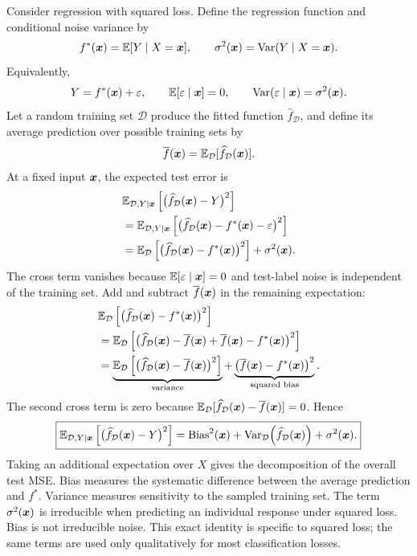 Consider regression with squared loss. Define the regression function and conditional noise variance by
\[
  f^*(\bm{x})=\mathbb{E}[Y\mid X=\bm{x}],
  \qquad
  \sigma^2(\bm{x})=\operatorname{Var}(Y\mid X=\bm{x}).
\]
Equivalently,
\[
  Y=f^*(\bm{x})+\varepsilon,
  \qquad
  \mathbb{E}[\varepsilon\mid\bm{x}]=0,
  \qquad
  \operatorname{Var}(\varepsilon\mid\bm{x})=\sigma^2(\bm{x}).
\]
Let a random training set $\mathcal D$ produce the fitted function $\widehat f_{\mathcal D}$, and define its average prediction over possible training sets by
\[
  \overline f(\bm{x})
  =\mathbb{E}_{\mathcal D}[\widehat f_{\mathcal D}(\bm{x})].
\]
At a fixed input $\bm{x}$, the expected test error is
\begin{align*}
  &\mathbb{E}_{\mathcal D,Y\mid\bm{x}}
    \left[\bigl(\widehat f_{\mathcal D}(\bm{x})-Y\bigr)^2\right]\\
  &=\mathbb{E}_{\mathcal D,Y\mid\bm{x}}
    \left[\bigl(
      \widehat f_{\mathcal D}(\bm{x})-f^*(\bm{x})-\varepsilon
    \bigr)^2\right]\\
  &=\mathbb{E}_{\mathcal D}
    \left[\bigl(
      \widehat f_{\mathcal D}(\bm{x})-f^*(\bm{x})
    \bigr)^2\right]
    +\sigma^2(\bm{x}).
\end{align*}
The cross term vanishes because $\mathbb{E}[\varepsilon\mid\bm{x}]=0$ and test-label noise is independent of the training set. Add and subtract $\overline f(\bm{x})$ in the remaining expectation:
\begin{align*}
  &\mathbb{E}_{\mathcal D}
    \left[\bigl(
      \widehat f_{\mathcal D}(\bm{x})-f^*(\bm{x})
    \bigr)^2\right]\\
  &=\mathbb{E}_{\mathcal D}\left[
    \bigl(
      \widehat f_{\mathcal D}(\bm{x})-\overline f(\bm{x})
      +\overline f(\bm{x})-f^*(\bm{x})
    \bigr)^2\right]\\
  &=\underbrace{
      \mathbb{E}_{\mathcal D}\left[
        \bigl(
          \widehat f_{\mathcal D}(\bm{x})-\overline f(\bm{x})
        \bigr)^2
      \right]
    }_{\text{variance}}
    +\underbrace{
      \bigl(\overline f(\bm{x})-f^*(\bm{x})\bigr)^2
    }_{\text{squared bias}}.
\end{align*}
The second cross term is zero because
$\mathbb{E}_{\mathcal D}[\widehat f_{\mathcal D}(\bm{x})-\overline f(\bm{x})]=0$. Hence
\[
  \boxed{
  \mathbb{E}_{\mathcal D,Y\mid\bm{x}}
  \left[\bigl(\widehat f_{\mathcal D}(\bm{x})-Y\bigr)^2\right]
  =\operatorname{Bias}^2(\bm{x})
   +\operatorname{Var}_{\mathcal D}\!\left(\widehat f_{\mathcal D}(\bm{x})\right)
   +\sigma^2(\bm{x}).}
\]
Taking an additional expectation over $X$ gives the decomposition of the overall test MSE. Bias measures the systematic difference between the average prediction and $f^*$. Variance measures sensitivity to the sampled training set. The term $\sigma^2(\bm{x})$ is irreducible when predicting an individual response under squared loss. Bias is not irreducible noise. This exact identity is specific to squared loss; the same terms are used only qualitatively for most classification losses.

